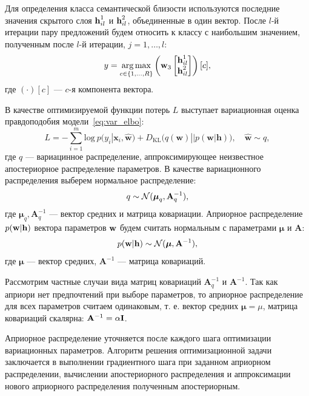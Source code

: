 Для определения класса семантической близости используются последние значения скрытого слоя ${\textbf{h}}_{il}^1$ и ${\textbf{h}}_{il}^2$, объединенные в один вектор. После $l$-й итерации 
пару предложений будем относить к классу с наибольшим значением, полученным после $l$-й итерации, $j=1,\dots,l$:
\begin{gather}
y = \argmax_{c\in \{1,\dots,R\}}
\left(\mathbf{w}_3%
\begin{bmatrix}
\bh_{il}^1\\
\bh_{il}^2
\end{bmatrix}\right)[c],
\label{eq:classify}
\end{gather}
где $(\cdot)[c]$ --- $c$-я компонента вектора. 

В качестве оптимизируемой функции потерь $L$ выступает вариационная оценка правдоподобия модели~\eqref{eq:var_elbo}:
\begin{equation}
\label{eq:applied_elbo}
    L = -\sum_{i=1}^m \text{log}~p({y}_i|\mathbf{x}_i, \hat{\mathbf{w}}) + D_\text{KL}\bigl(q (\mathbf{w}) || p (\mathbf{w}|\mathbf{h})\bigr),\quad \hat{\mathbf{w}} \sim q,
\end{equation}
где $q$ --- вариацинное распределение, аппроксимирующее неизвестное апостериорное распределение параметров.
В качестве вариационного распределения выберем нормальное распределение:
$$q \sim {\mathcal{N}}(\boldsymbol{\mu}_q,\mathbf{A}_q^{-1}),$$
где $\boldsymbol{\mu}_q,\mathbf{A}_q^{-1}$ --- вектор средних и матрица ковариации.
Априорное распределение $p({\textbf{w}}|\mathbf{h})$ вектора параметров ${\textbf{w}}$ будем считать нормальным с параметрами $\boldsymbol{\mu}$ и $\mathbf{A}$:
$$p({\textbf{w}}|\mathbf{h}) \sim {\mathcal{N}}(\boldsymbol{\mu}, \mathbf{A}^{-1}),$$
где $\boldsymbol{\mu}$ --- вектор средних, $\mathbf{A}^{-1}$ --- матрица ковариаций.

Рассмотрим частные случаи вида матриц ковариаций $\mathbf{A}^{-1}_q$ и $\mathbf{A}^{-1}$. Так как априори нет предпочтений при выборе параметров, то априорное распределение для всех параметров считаем одинаковым, т. е. вектор средних $\boldsymbol{\mu} = \mu$, матрица ковариаций скалярна: $\mathbf{A}^{-1} = \alpha{\textbf{I}}$.

Априорное распределение уточняется после каждого шага оптимизации вариационных параметров.
Алгоритм решения оптимизационной задачи заключается в выполнении градиентного шага при заданном априорном распределении, вычислении апостериорного распределения и аппроксимации нового априорного распределения полученным апостериорным.

